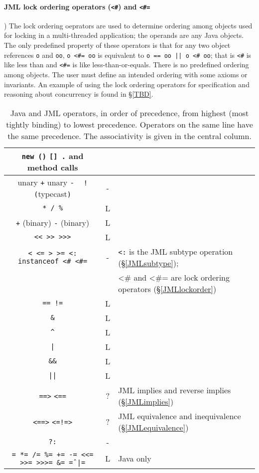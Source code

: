 \paragraph{JML lock ordering operators (\texttt{<\#}) and \texttt{<\#=}})
\label{JMLlockorder}
The lock ordering oeprators are used to determine ordering among objects used for locking in a multi-threaded application; the operands are any Java objects. The only predefined property of these operators is that for any two 
object references \texttt{o} and \texttt{oo}, \texttt{o <\#= oo} is equivalent to \texttt{o == oo || o <\# oo}; that is \texttt{<\#} is like less than and \texttt{<\#=} is like less-than-or-equals. There is no predefined ordering among objects. The user must define an intended ordering with some axioms or invariants. An example of using the lock ordering operators for specification and reasoning about concurrency is found in \S\ref{TBD}.

\begin{table}
\begin{tabular}{|c|c|l|}
\hline
\texttt{new ()} \texttt{[] .} and method calls  \\ \hline
unary \texttt{+} unary \texttt{-} \texttt{~} \texttt{!} \texttt{(}typecast\texttt{)} & - & \\ \hline
\texttt{* / \%}  & L & \\ \hline
\texttt{+} (binary) \texttt{-} (binary) & L & \\ \hline
\texttt{<< >> >>>} & L & \\ \hline
\texttt{< <= > >= <: instanceof  <\# <\#=}  & - & \texttt{<:} is the JML subtype operation (\S\ref{JMLsubtype}); \\
						                                           & & <\# and <\#= are lock ordering operators (\S\ref{JMLlockorder}) \\ \hline
\texttt{== !=} & L & \\ \hline
\texttt{\&} & L & \\ \hline
\texttt{\^} & L &  \\ \hline
\texttt{|} & L &  \\ \hline
\texttt{\&\&} & L &  \\ \hline
\texttt{||} & L &  \\ \hline
\texttt{==>} \texttt{<==} & ? & JML implies and reverse implies (\S\ref{JMLimplies}) \\ \hline
\texttt{<==>} \texttt{<=!=>} & ? & JML equivalence and inequivalence (\S\ref{JMLequivalence}) \\ \hline
\texttt{?:} & - & \\ \hline
\texttt{= *= /= \%= += -= <<= >>= >>>= \&= \^= |=} & L & Java only\\ \hline

\end{tabular}
\label{Tab:precedence}
\caption{Java and JML operators, in order of precedence, from highest (most tightly binding) to lowest precedence. Operators on the same line have the same precedence. The associativity is given in the central column.}
\end{table}


